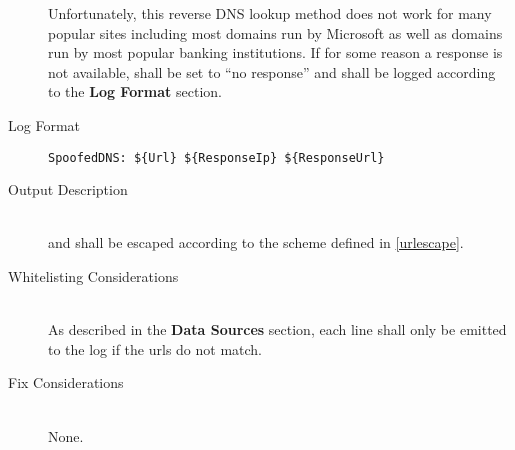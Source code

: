 \begin{description}
Unfortunately, this reverse DNS lookup method does not work for many popular
sites including most domains run by Microsoft as well as domains run by most
popular banking institutions.  If for some reason a response is not available,
 shall be set to ``no response'' and shall be logged according
to the \textbf{Log Format} section.
\item[Log Format] \hfill
\vspace{-\baselineskip}
\begin{verbatim}
SpoofedDNS: ${Url} ${ResponseIp} ${ResponseUrl}
\end{verbatim}
\item[Output Description] \hfill \\
 and  shall be escaped according to the
scheme defined in \ref{urlescape}.
\item[Whitelisting Considerations] \hfill \\
As described in the \textbf{Data Sources} section, each line shall only be
emitted to the log if the urls do not match.
\item[Fix Considerations] \hfill \\
None.
\end{description}

